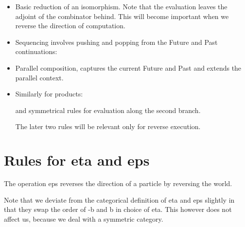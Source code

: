 \documentclass[preprint]{sigplanconf}
\begin{document}
\begin{itemize}
\item 
Basic reduction of an isomorphism. Note that the evaluation leaves the
adjoint of the combinator behind. This will become important when we
reverse the direction of computation.


\item
Sequencing involves pushing and popping from the Future and Past
continuations:


\item
Parallel composition, captures the current Future and Past and extends
the parallel context.


\item
Similarly for products:


and symmetrical rules for evaluation along the second branch. 

The later two rules will be relevant only for reverse execution. 

\end{itemize}


\section{Rules for {{eta}} and {{eps}} }

The operation {{eps}} reverses the direction of a particle by
reversing the world. 

Note that we deviate from the categorical definition of {{eta}} and
{{eps}} slightly in that they swap the order of {{-b}} and {{b}} in
choice of {{eta}}. This however does not affect us, because we deal
with a symmetric category.
\end{document}
